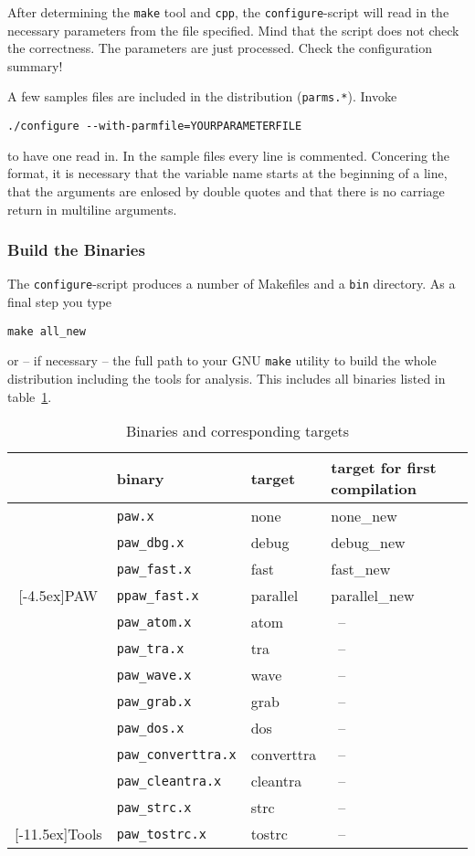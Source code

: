 \documentclass[a4paper,10pt]{article}
\newcommand{\PAW}{\textsc{PAW}}
\begin{document}
After determining the \texttt{make} tool and \texttt{cpp}, the
\texttt{configure}-script will read in the necessary parameters from the file
specified. Mind that the script does not check the correctness. The parameters
are just processed. Check the configuration summary!

A few samples files are included in the distribution (\texttt{parms.*}).  Invoke 
\begin{verbatim}
./configure --with-parmfile=YOURPARAMETERFILE
\end{verbatim}
to have one read in.  In the sample files every line is commented. Concering
the format, it is necessary that the variable name starts at the beginning of a
line, that the arguments are enlosed by double quotes and that there is no
carriage return in multiline arguments.


\subsubsection*{Build the Binaries}
The \texttt{configure}-script produces a number of Makefiles and a \texttt{bin}
directory.  As a final step you type
\begin{verbatim}
make all_new
\end{verbatim}
or -- if necessary -- the full path to your GNU \texttt{make} utility to build
the whole distribution including the tools for analysis. This includes all
binaries listed in table~\ref{tab:bins}.

\begin{table}[h]
\centering
\begin{tabular}{|c|l|l|l|} \hline
          & binary       & target & target for first compilation \\ \hline \hline
          & {\tt paw.x}        & none   & none\_new \\
          & {\tt paw\_dbg.x}    & debug  & debug\_new \\
          & {\tt paw\_fast.x}   & fast   & fast\_new \\
\raisebox{4.5ex}[-4.5ex]{\PAW}  & {\tt ppaw\_fast.x}  & parallel & parallel\_new \\ \hline
          & {\tt paw\_atom.x}  & atom & \ --  \\
          & {\tt paw\_tra.x}   & tra  & \ -- \\
          & {\tt paw\_wave.x}  & wave & \ -- \\
          & {\tt paw\_grab.x}  & grab & \ -- \\
          & {\tt paw\_dos.x}  & dos & \ -- \\
          & {\tt paw\_converttra.x} & converttra & \ -- \\
          & {\tt paw\_cleantra.x }  & cleantra   & \ -- \\
          & {\tt paw\_strc.x}       & strc       & \ -- \\
\raisebox{11.5ex}[-11.5ex]{Tools}  & {\tt paw\_tostrc.x}     & tostrc     & \ -- \\ \hline
\end{tabular}
\caption{Binaries and corresponding targets}
\label{tab:bins}
\end{table}
\end{document}

